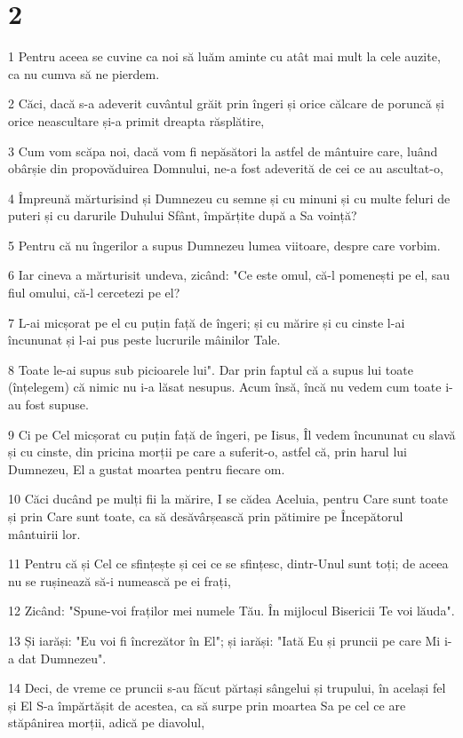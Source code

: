 \chapter{2}

\par 1 Pentru aceea se cuvine ca noi să luăm aminte cu atât mai mult la cele auzite, ca nu cumva să ne pierdem.
\par 2 Căci, dacă s-a adeverit cuvântul grăit prin îngeri și orice călcare de poruncă și orice neascultare și-a primit dreapta răsplătire,
\par 3 Cum vom scăpa noi, dacă vom fi nepăsători la astfel de mântuire care, luând obârșie din propovăduirea Domnului, ne-a fost adeverită de cei ce au ascultat-o,
\par 4 Împreună mărturisind și Dumnezeu cu semne și cu minuni și cu multe feluri de puteri și cu darurile Duhului Sfânt, împărțite după a Sa voință?
\par 5 Pentru că nu îngerilor a supus Dumnezeu lumea viitoare, despre care vorbim.
\par 6 Iar cineva a mărturisit undeva, zicând: "Ce este omul, că-l pomenești pe el, sau fiul omului, că-l cercetezi pe el?
\par 7 L-ai micșorat pe el cu puțin față de îngeri; și cu mărire și cu cinste l-ai încununat și l-ai pus peste lucrurile mâinilor Tale.
\par 8 Toate le-ai supus sub picioarele lui". Dar prin faptul că a supus lui toate (înțelegem) că nimic nu i-a lăsat nesupus. Acum însă, încă nu vedem cum toate i-au fost supuse.
\par 9 Ci pe Cel micșorat cu puțin față de îngeri, pe Iisus, Îl vedem încununat cu slavă și cu cinste, din pricina morții pe care a suferit-o, astfel că, prin harul lui Dumnezeu, El a gustat moartea pentru fiecare om.
\par 10 Căci ducând pe mulți fii la mărire, I se cădea Aceluia, pentru Care sunt toate și prin Care sunt toate, ca să desăvârșească prin pătimire pe Începătorul mântuirii lor.
\par 11 Pentru că și Cel ce sfințește și cei ce se sfințesc, dintr-Unul sunt toți; de aceea nu se rușinează să-i numească pe ei frați,
\par 12 Zicând: "Spune-voi fraților mei numele Tău. În mijlocul Bisericii Te voi lăuda".
\par 13 Și iarăși: "Eu voi fi încrezător în El"; și iarăși: "Iată Eu și pruncii pe care Mi i-a dat Dumnezeu".
\par 14 Deci, de vreme ce pruncii s-au făcut părtași sângelui și trupului, în același fel și El S-a împărtășit de acestea, ca să surpe prin moartea Sa pe cel ce are stăpânirea morții, adică pe diavolul,
